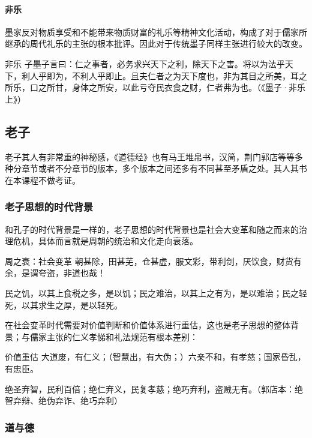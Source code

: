 \documentclass{ctexart}
\begin{document}
\paragraph{非乐}

墨家反对物质享受和不能带来物质财富的礼乐等精神文化活动，构成了对于儒家所继承的周代礼乐的主张的根本批评。因此对于传统墨子同样主张进行较大的改变。

\begin{fancybox}{非乐}
    子墨子言曰：仁之事者，必务求兴天下之利，除天下之害。将以为法乎天下，利人乎即为，不利人乎即止。且夫仁者之为天下度也，非为其目之所美，耳之所乐，口之所甘，身体之所安，以此亏夺民衣食之财，仁者弗为也。（《墨子·非乐上》）
\end{fancybox}

\subsection{老子}

老子其人有非常重的神秘感，《道德经》也有马王堆帛书，汉简，荆门郭店等等多种分章节或者不分章节的版本，多个版本之间还多有不同甚至矛盾之处。其人其书在本课程不做考证。

\subsubsection{老子思想的时代背景}

和孔子的时代背景是一样的，老子思想的时代背景也是社会大变革和随之而来的治理危机，具体而言就是周朝的统治和文化走向衰落。

\begin{fancybox}{周之衰：社会变革}
    朝甚除，田甚芜，仓甚虚，服文彩，带利剑，厌饮食，财货有余，是谓夸盗，非道也哉！

    民之饥，以其上食税之多，是以饥；民之难治，以其上之有为，是以难治；民之轻死，以其求生之厚，是以轻死。
\end{fancybox}

在社会变革时代需要对价值判断和价值体系进行重估，这也是老子思想的整体背景；与儒家主张的仁义孝悌和礼法规范有根本差别：

\begin{fancybox}{价值重估}
    大道废，有仁义；（智慧出，有大伪；）六亲不和，有孝慈；国家昏乱，有忠臣。

    绝圣弃智，民利百倍；绝仁弃义，民复孝慈；绝巧弃利，盗贼无有。（郭店本：绝智弃辩、绝伪弃诈、绝巧弃利）
\end{fancybox}

\subsubsection{道与德}
\end{document}

